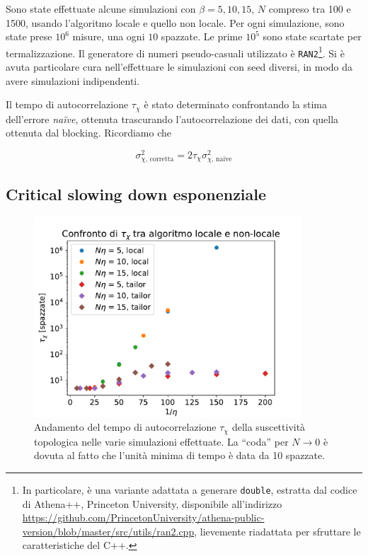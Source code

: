 \documentclass[a4paper,11pt]{article}
\newcommand{\code}[1]{\texttt{#1}}
\begin{document}
    Sono state effettuate alcune simulazioni con $\beta = 5, 10, 15$, $N$ compreso tra 100 e 1500, usando l'algoritmo locale e quello non locale. Per ogni simulazione, sono state prese $10^6$ misure, una ogni $10$ spazzate. Le prime $10^5$ sono state scartate per termalizzazione. Il generatore di numeri pseudo-casuali utilizzato è \code{RAN2}\footnote{In particolare, è una variante adattata a generare \code{double}, estratta dal codice di Athena++, Princeton University, disponibile all'indirizzo \url{https://github.com/PrincetonUniversity/athena-public-version/blob/master/src/utils/ran2.cpp}, lievemente riadattata per sfruttare le caratteristiche del C++.}. Si è avuta particolare cura nell'effettuare le simulazioni con seed diversi, in modo da avere simulazioni indipendenti.
    
    Il tempo di autocorrelazione $\tau_\chi$ è stato determinato confrontando la stima dell'errore \emph{naïve}, ottenuta trascurando l'autocorrelazione dei dati, con quella ottenuta dal blocking. Ricordiamo che
    
    \begin{equation}
        \sigma^2_{\chi \text{, corretta}} = 2 \tau_\chi \sigma^2_{\chi \text{, naïve}}
    \end{equation}

    
    \subsection{Critical slowing down esponenziale}
    
    \begin{figure}[hptb]
        \centering
        \includegraphics[width=10cm]{figure/csd_autocorr.pdf}
        \caption{Andamento del tempo di autocorrelazione $\tau_\chi$ della suscettività topologica nelle varie simulazioni effettuate. La ``coda'' per $N \to 0$ è dovuta al fatto che l'unità minima di tempo è data da 10 spazzate.}
        \label{fig:csd_autocorr}
    \end{figure}
\end{document}
